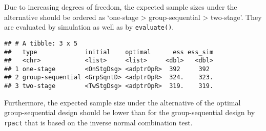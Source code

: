 \documentclass[]{book}
\newenvironment{Shaded}{\begin{snugshade}}{\end{snugshade}}
\newcommand{\CommentTok}[1]{\textcolor[rgb]{0.56,0.35,0.01}{\textit{#1}}}
\newcommand{\DataTypeTok}[1]{\textcolor[rgb]{0.13,0.29,0.53}{#1}}
\newcommand{\DecValTok}[1]{\textcolor[rgb]{0.00,0.00,0.81}{#1}}
\newcommand{\FloatTok}[1]{\textcolor[rgb]{0.00,0.00,0.81}{#1}}
\newcommand{\KeywordTok}[1]{\textcolor[rgb]{0.13,0.29,0.53}{\textbf{#1}}}
\newcommand{\NormalTok}[1]{#1}
\newcommand{\OperatorTok}[1]{\textcolor[rgb]{0.81,0.36,0.00}{\textbf{#1}}}
\newcommand{\StringTok}[1]{\textcolor[rgb]{0.31,0.60,0.02}{#1}}
\begin{document}
Due to increasing degrees of freedom, the expected sample sizes under the
alternative should be ordered as `one-stage \textgreater{} group-sequential \textgreater{} two-stage'.
They are evaluated by simulation as well as by \texttt{evaluate()}.

\begin{Shaded}
\end{Shaded}

\begin{verbatim}
## # A tibble: 3 x 5
##   type             initial    optimal      ess ess_sim
##   <chr>            <list>     <list>     <dbl>   <dbl>
## 1 one-stage        <OnStgDsg> <adptrOpR>  392     392 
## 2 group-sequential <GrpSqntD> <adptrOpR>  324.    323.
## 3 two-stage        <TwStgDsg> <adptrOpR>  319.    319.
\end{verbatim}

Furthermore, the expected sample size under the alternative of the
optimal group-sequential design should be lower than for the
group-sequential design by \texttt{rpact} that is based on the inverse normal
combination test.
\end{document}
